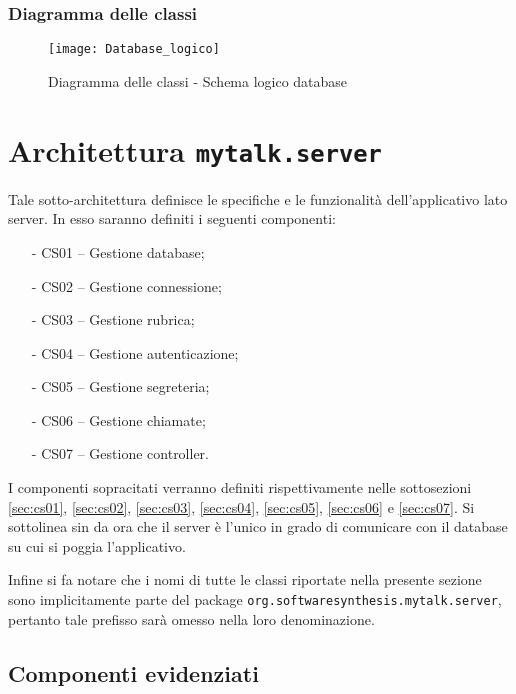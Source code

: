 \subsubsection{Diagramma delle classi}
\begin{figure}[H]
\begin{center}
\texttt{[image: Database\_logico]}
\caption{Diagramma delle classi - Schema logico database}\label{fig:database_logico}
\end{center}
\end{figure}
\clearpage


\section{Architettura \texttt{mytalk.server}}\label{sec:server}
Tale sotto-architettura definisce le specifiche e le funzionalità dell'applicativo lato server. In esso saranno definiti i seguenti componenti:
\begin{itemize}[noitemsep,nolistsep]
	\item[-] \textsf{CS01 -- Gestione database};
	\item[-] \textsf{CS02 -- Gestione connessione};
	\item[-] \textsf{CS03 -- Gestione rubrica};
	\item[-] \textsf{CS04 -- Gestione autenticazione};
	\item[-] \textsf{CS05 -- Gestione segreteria};
	\item[-] \textsf{CS06 -- Gestione chiamate};
	\item[-] \textsf{CS07 -- Gestione controller}.
\end{itemize}

I componenti sopracitati verranno definiti rispettivamente nelle sottosezioni \ref{sec:cs01}, \ref{sec:cs02}, \ref{sec:cs03}, \ref{sec:cs04}, \ref{sec:cs05}, \ref{sec:cs06} e \ref{sec:cs07}. Si sottolinea sin da ora che il server è l'unico in grado di comunicare con il database su cui si poggia l'applicativo.

Infine si fa notare che i nomi di tutte le classi riportate nella presente sezione sono implicitamente parte del package \texttt{org.softwaresynthesis.mytalk.server}, pertanto tale prefisso sarà omesso nella loro denominazione.


\subsection{Componenti evidenziati}

